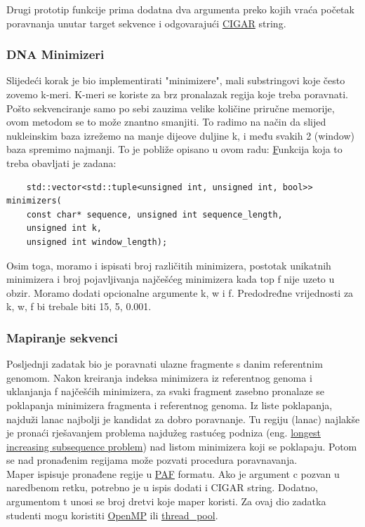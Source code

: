\documentclass[times, 12pt, utf8]{article}
\begin{document}
	Drugi prototip funkcije prima dodatna dva argumenta preko kojih
	vraća početak poravnanja unutar \colorbox{gray!30}{target}
	sekvence i odgovarajući \href {https://samtools.github.io/hts-specs/SAMv1.pdf}{CIGAR} string.
	
	\subsubsection{DNA Minimizeri}
	Slijedeći korak je bio implementirati "minimizere", mali substringovi koje često zovemo k-meri. K-meri se koriste za brz pronalazak regija koje treba poravnati. Pošto sekvenciranje samo po sebi zauzima velike količine priručne memorije, ovom metodom se to može znantno smanjiti. To radimo na način da slijed nukleinskim baza izrežemo na manje dijeove duljine k, i među svakih 2 (window) baza spremimo najmanji. To je pobliže opisano u ovom radu: \href{https://academic.oup.com/bioinformatics/article/20/18/3363/202143} Funkcija koja to treba obavljati je zadana:
	
	\begin{lstlisting}
	std::vector<std::tuple<unsigned int, unsigned int, bool>> minimizers(
	const char* sequence, unsigned int sequence_length,
	unsigned int k,
	unsigned int window_length);
	\end{lstlisting}
	
	Osim toga, moramo i ispisati broj različitih minimizera, postotak unikatnih minimizera i broj pojavljivanja najčešćeg minimizera kada top f nije uzeto u obzir. Moramo dodati opcionalne argumente \colorbox{gray!30}{k}, \colorbox{gray!30}{w} i \colorbox{gray!30}{f}. Predodređne vrijednosti za \colorbox{gray!30}{k, w, f} bi trebale biti \colorbox{gray!30}{15, 5, 0.001}.
	\subsubsection{Mapiranje sekvenci}
	Posljednji zadatak bio je poravnati ulazne fragmente s danim referentnim genomom.
	Nakon kreiranja indeksa minimizera iz referentnog genoma i uklanjanja f najčešćih minimizera, za svaki fragment zasebno pronalaze se poklapanja minimizera fragmenta i referentnog genoma. Iz liste poklapanja, najduži lanac najbolji je kandidat za dobro poravnanje. Tu regiju (lanac) najlakše je pronaći rješavanjem problema najdužeg rastućeg podniza (eng. \href{https://en.wikipedia.org/wiki/Longest_increasing_subsequence}{longest increasing subsequence problem}) nad listom minimizera koji se poklapaju. 
	Potom se nad pronađenim regijama može pozvati procedura poravnavanja. \\
	Maper ispisuje pronađene regije u \href{https://github.com/lh3/miniasm/blob/master/PAF.md}{PAF} formatu. Ako je argument \colorbox{gray!30}{c} pozvan u naredbenom retku, potrebno je u ispis dodati i CIGAR string.
	Dodatno, argumentom \colorbox{gray!30}{t} unosi se broj dretvi koje maper koristi. Za ovaj dio zadatka studenti mogu koristiti \href{https://www.openmp.org/}{OpenMP} ili \href{https://github.com/rvaser/thread_pool}{thread\_pool}.
	
\end{document}
